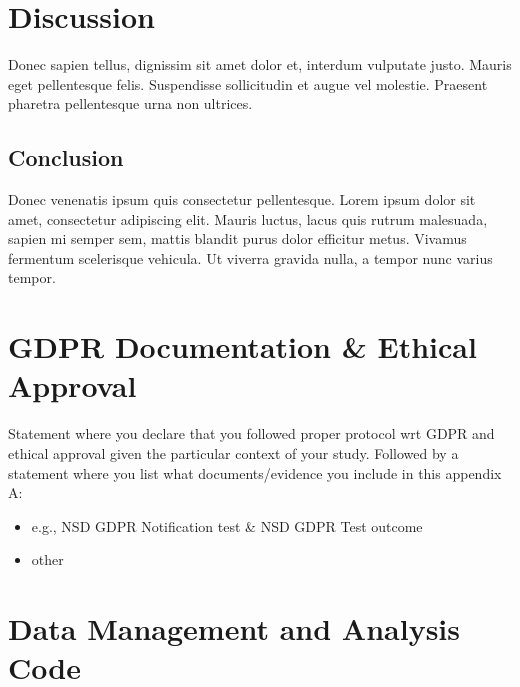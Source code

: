 \documentclass[a4paper,12pt,stu,donotrepeattitle,floatsintext,twoside]{apa7}
\begin{document}
\section{Discussion}

Donec sapien tellus, dignissim sit amet dolor et, interdum vulputate justo. Mauris eget pellentesque felis. Suspendisse sollicitudin et augue vel molestie. Praesent pharetra pellentesque urna non ultrices.

\subsection{Conclusion}

Donec venenatis ipsum quis consectetur pellentesque. Lorem ipsum dolor sit amet, consectetur adipiscing elit. Mauris luctus, lacus quis rutrum malesuada, sapien mi semper sem, mattis blandit purus dolor efficitur metus. Vivamus fermentum scelerisque vehicula. Ut viverra gravida nulla, a tempor nunc varius tempor.

\printbibliography


\appendix

\section{GDPR Documentation \& Ethical Approval}\label{app:A}

\appindent Statement where you declare that you followed proper protocol wrt GDPR and ethical approval given the particular context of your study. Followed by a statement where you list what documents/evidence you include in this appendix A:
\begin{itemize}
    \item e.g., NSD GDPR Notification test \& NSD GDPR Test outcome
    \item other
\end{itemize}




\section{Data Management and Analysis Code}\label{app:B}
\end{document}
